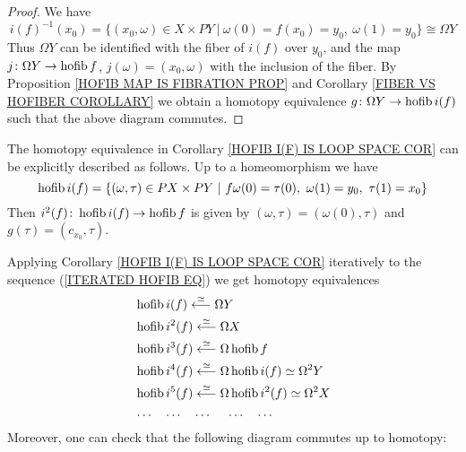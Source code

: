 \begin{proof}
We have 
\[
i(f)^{-1}(x_{0}) = \{(x_{0}, \omega) \in X \times PY \ |\ 
\omega(0) = f(x_{0}) = y_{0}, \ \omega(1) = y_{0}\} \cong \Omega Y
\]
Thus $\Omega Y$ can be identified with the fiber of $i(f)$ over $y_{0}$,
and the map $j\colon \Omega Y \to \operatorname{hofib} f$, $j(\omega) = (x_{0}, \omega)$
with the inclusion of the fiber. By Proposition \ref{HOFIB MAP IS FIBRATION PROP}
and Corollary \ref{FIBER VS HOFIBER COROLLARY} we obtain a homotopy 
equivalence $g\colon \Omega Y \to \operatorname{hofib} i(f)$ such that the above diagram commutes.
\end{proof}

\begin{note}
The homotopy equivalence in Corollary \ref{HOFIB I(F) IS LOOP SPACE COR}
can be explicitly described as follows. Up to a homeomorphism we have 
\[
\hofib i(f) = 
\{ (\omega, \tau)\in PX \times PY \ | \ 
f\omega(0) = \tau(0), \ \omega(1) = y_{0}, \ \tau(1) = x_{0}\}
\]
Then $i^{2}(f)\colon \operatorname{hofib} i(f) \to \operatorname{hofib} f$ is given by 
$(\omega, \tau) = (\omega(0), \tau)$ and $g(\tau) = (c_{x_{0}}, \tau)$. 
\end{note}

Applying Corollary \ref{HOFIB I(F) IS LOOP SPACE COR} iteratively to the sequence 
(\ref{ITERATED HOFIB EQ}) we get homotopy equivalences
\begin{align*}
& \operatorname{hofib} i(f) \overset{\simeq}{\longleftarrow}\Omega Y  \\
& \operatorname{hofib} i^{2}(f) \overset{\simeq}{\longleftarrow}\Omega X  \\
& \operatorname{hofib} i^{3}(f) \overset{\simeq}{\longleftarrow}\Omega \operatorname{hofib} f  \\
& \operatorname{hofib} i^{4}(f) \overset{\simeq}{\longleftarrow}\Omega \operatorname{hofib} i(f) \simeq \Omega^{2} Y \\
& \operatorname{hofib} i^{5}(f) \overset{\simeq}{\longleftarrow}\Omega \operatorname{hofib} i^{2}(f) \simeq \Omega^{2} X \\
& \dots \ \ \ \dots \ \ \ \dots \ \ \ \ \dots \ \ \ \dots \\
\end{align*}
Moreover, one can check that the following diagram commutes up to homotopy:

